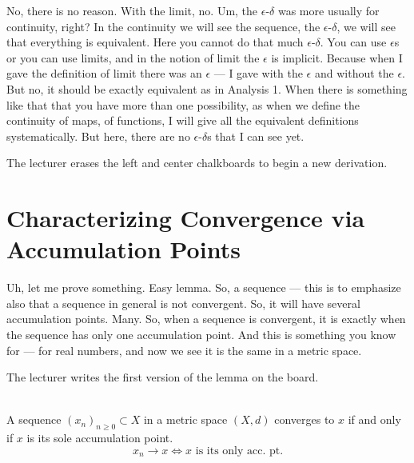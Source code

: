 \begin{spoken-clean}[00:02:12 - 00:03:12]
No, there is no reason. With the limit, no. Um, the $\epsilon$-$\delta$ was more usually for continuity, right? In the continuity we will see the sequence, the $\epsilon$-$\delta$, we will see that everything is equivalent. Here you cannot do that much $\epsilon$-$\delta$. You can use $\epsilon$s or you can use limits, and in the notion of limit the $\epsilon$ is implicit. Because when I gave the definition of limit there was an $\epsilon$ — I gave with the $\epsilon$ and without the $\epsilon$. But no, it should be exactly equivalent as in Analysis 1. When there is something like that that you have more than one possibility, as when we define the continuity of maps, of functions, I will give all the equivalent definitions systematically. But here, there are no $\epsilon$-$\delta$s that I can see yet.
\end{spoken-clean}

\begin{meta-note}[Transition]
The lecturer erases the left and center chalkboards to begin a new derivation.
\end{meta-note}

\section*{Characterizing Convergence via Accumulation Points}

\begin{spoken-clean}[00:03:13 - 00:05:03]
Uh, let me prove something. Easy lemma. So, a sequence — this is to emphasize also that a sequence in general is not convergent. So, it will have several accumulation points. Many. So, when a sequence is convergent, it is exactly when the sequence has only one accumulation point. And this is something you know for — for real numbers, and now we see it is the same in a metric space.
\end{spoken-clean}

\begin{math-stroke}
\begin{nice-box}
The lecturer writes the first version of the lemma on the board.
\end{nice-box}
\begin{lemma*}\label{lem:convergence-acc-point-v1}
\textcolor{red}{} \\
A sequence $(x_n)_{n \ge 0} \subset X$ in a metric space $(X, d)$ converges to $x$ if and only if $x$ is its sole accumulation point.
\[ x_n \to x \iff x \text{ is its only acc. pt.} \]
\end{lemma*}
\end{math-stroke}

